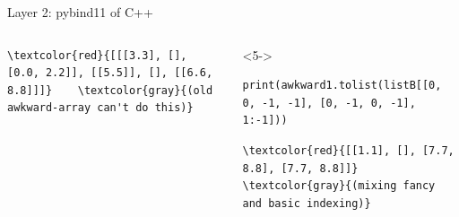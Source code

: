 \documentclass[aspectratio=169]{beamer}
\begin{document}
\begin{frame}[fragile]{Layer 2: pybind11 of C++}
\begin{columns}
\begin{uncoverenv}
\vspace{-0.25 cm}
\begin{Verbatim}[commandchars=\\\{\}]
\textcolor{red}{[[[3.3], [], [0.0, 2.2]], [[5.5]], [], [[6.6, 8.8]]]}    \textcolor{gray}{(old awkward-array can't do this)}
\end{Verbatim}
\end{uncoverenv}
\begin{uncoverenv}<5->
\begin{verbatim}
print(awkward1.tolist(listB[[0, 0, -1, -1], [0, -1, 0, -1], 1:-1]))
\end{verbatim}

\vspace{-0.25 cm}
\begin{Verbatim}[commandchars=\\\{\}]
\textcolor{red}{[[1.1], [], [7.7, 8.8], [7.7, 8.8]]}                     \textcolor{gray}{(mixing fancy and basic indexing)}
\end{Verbatim}
\end{uncoverenv}
\end{columns}
\vspace{1 cm}
\end{frame}
\end{document}
